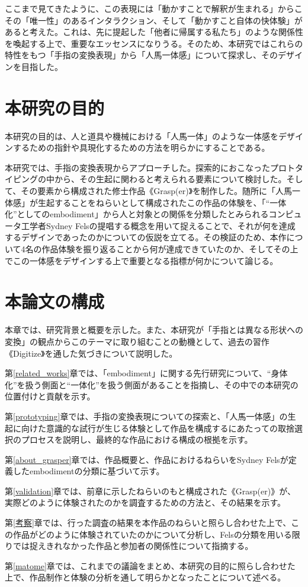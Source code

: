 ここまで見てきたように、この表現には「動かすことで解釈が生まれる」からこその「唯一性」のあるインタラクション、そして「動かすこと自体の快体験」があると考えた。これは、先に提起した「他者に帰属する私たち」のような関係性を喚起する上で、重要なエッセンスになりうる。そのため、本研究ではこれらの特性をもつ「手指の変換表現」から「人馬一体感」について探求し、そのデザインを目指した。

\section{本研究の目的}

本研究の目的は、人と道具や機械における「人馬一体」のような一体感をデザインするための指針や具現化するための方法を明らかにすることである。

本研究では、手指の変換表現からアプローチした。探索的におこなったプロトタイピングの中から、その生起に関わると考えられる要素について検討した。そして、その要素から構成された修士作品《Grasp(er)》を制作した。随所に「人馬一体感」が生起することをねらいとして構成されたこの作品の体験を、「``一体化''としてのembodiment」から人と対象との関係を分類したとみられるコンピュータ工学者Sydney Felsの提唱する概念を用いて捉えることで、それが何を達成するデザインであったのかについての仮説を立てる。その検証のため、本作について4名の作品体験を振り返ることから何が達成できていたのか、そしてその上でこの一体感をデザインする上で重要となる指標が何かについて論じる。

\section{本論文の構成}
本章では、研究背景と概要を示した。また、本研究が「手指とは異なる形状への変換」の観点からこのテーマに取り組むことの動機として、過去の習作《Digitize》を通した気づきについて説明した。

第\ref{related_works}章では、「embodiment」に関する先行研究について、``身体化''を扱う側面と``一体化''を扱う側面があることを指摘し、その中での本研究の位置付けと貢献を示す。

第\ref{prototyping}章では、手指の変換表現についての探索と、「人馬一体感」の生起に向けた意識的な試行が生じる体験として作品を構成するにあたっての取捨選択のプロセスを説明し、最終的な作品における構成の根拠を示す。

第\ref{about_grasper}章では、作品概要と、作品におけるねらいをSydney Felsが定義したembodimentの分類に基づいて示す。

第\ref{validation}章では、前章に示したねらいのもと構成された《Grasp(er)》が、実際どのように体験されたのかを調査するための方法と、その結果を示す。

第\ref{考察}章では、行った調査の結果を本作品のねらいと照らし合わせた上で、この作品がどのように体験されていたのかについて分析し、Felsの分類を用いる限りでは捉えきれなかった作品と参加者の関係性について指摘する。

第\ref{matome}章では、これまでの議論をまとめ、本研究の目的に照らし合わせた上で、作品制作と体験の分析を通して明らかとなったことについて述べる。